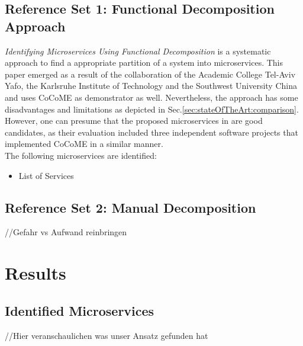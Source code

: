 \subsection{Reference Set 1: Functional Decomposition Approach}
\textit{Identifying Microservices Using Functional Decomposition} \cite{FunctionalDecompositionHeinrich} is a systematic approach to find a appropriate partition of a system into microservices. This paper emerged as a result of the collaboration of the Academic College Tel-Aviv Yafo, the Karlsruhe Institute of Technology and the Southwest University China and uses CoCoME as demonstrator as well. Nevertheless, the approach has some disadvantages and limitations as depicted in Sec.\ref{sec:stateOfTheArt:comparison}. 
\\
However, one can presume that the proposed microservices in \cite{FunctionalDecompositionHeinrich} are good candidates, as their evaluation included three independent software projects that implemented CoCoME in a similar manner. \\
The following microservices are identified: 
\begin{itemize}
    \item  List of Services
\end{itemize}

\subsection{Reference Set 2: Manual Decomposition}
//Gefahr vs Aufwand reinbringen


\section{Results}
\label{sec:Evalutation:Results}

\subsection{Identified Microservices}
//Hier veranschaulichen was unser Ansatz gefunden hat


